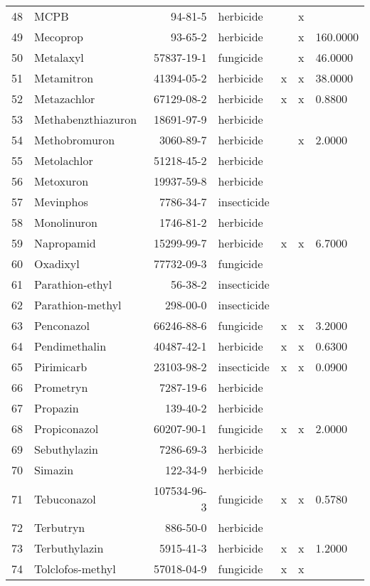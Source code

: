 \begin{longtable}{lp{3cm}rlp{0.5cm}p{0.5cm}p{1.5cm}}
  48 & MCPB & 94-81-5 & herbicide &  & x &  \\ 
  49 & Mecoprop & 93-65-2 & herbicide &  & x & 160.0000 \\ 
  50 & Metalaxyl & 57837-19-1 & fungicide &  & x & 46.0000 \\ 
  51 & Metamitron & 41394-05-2 & herbicide & x & x & 38.0000 \\ 
  52 & Metazachlor & 67129-08-2 & herbicide & x & x & 0.8800 \\ 
  53 & Methabenzthiazuron & 18691-97-9 & herbicide &  &  &  \\ 
  54 & Methobromuron & 3060-89-7 & herbicide &  & x & 2.0000 \\ 
  55 & Metolachlor & 51218-45-2 & herbicide &  &  &  \\ 
  56 & Metoxuron & 19937-59-8 & herbicide &  &  &  \\ 
  57 & Mevinphos & 7786-34-7 & insecticide &  &  &  \\ 
  58 & Monolinuron & 1746-81-2 & herbicide &  &  &  \\ 
  59 & Napropamid & 15299-99-7 & herbicide & x & x & 6.7000 \\ 
  60 & Oxadixyl & 77732-09-3 & fungicide &  &  &  \\ 
  61 & Parathion-ethyl & 56-38-2 & insecticide &  &  &  \\ 
  62 & Parathion-methyl & 298-00-0 & insecticide &  &  &  \\ 
  63 & Penconazol & 66246-88-6 & fungicide & x & x & 3.2000 \\ 
  64 & Pendimethalin & 40487-42-1 & herbicide & x & x & 0.6300 \\ 
  65 & Pirimicarb & 23103-98-2 & insecticide & x & x & 0.0900 \\ 
  66 & Prometryn & 7287-19-6 & herbicide &  &  &  \\ 
  67 & Propazin & 139-40-2 & herbicide &  &  &  \\ 
  68 & Propiconazol & 60207-90-1 & fungicide & x & x & 2.0000 \\ 
  69 & Sebuthylazin & 7286-69-3 & herbicide &  &  &  \\ 
  70 & Simazin & 122-34-9 & herbicide &  &  &  \\ 
  71 & Tebuconazol & 107534-96-3 & fungicide & x & x & 0.5780 \\ 
  72 & Terbutryn & 886-50-0 & herbicide &  &  &  \\ 
  73 & Terbuthylazin & 5915-41-3 & herbicide & x & x & 1.2000 \\ 
  74 & Tolclofos-methyl & 57018-04-9 & fungicide & x & x &  \\ 

\end{longtable}
